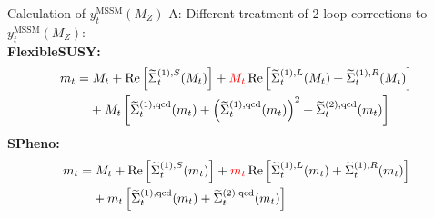 \documentclass[hyperref={pdfpagelabels=false},ngerman]{beamer}
\DeclareMathOperator{\re}{Re}
\renewcommand{\emph}{\textbf}
\begin{document}
\begin{frame}[noframenumbering]{Calculation of $y_t^{\text{MSSM}}(M_Z)$}
  A: Different treatment of 2-loop corrections to $y_t^{\text{MSSM}}(M_Z)$:
  \\[1em]
  \emph{FlexibleSUSY:}
  \begin{align*}
    m_t &=
    M_t+\re\left[
      \widetilde{\Sigma}_t^{(1),S}(M_t)\right] +
    \textcolor{red}{M_t} \re\left[
      \widetilde{\Sigma}_t^{(1),L}(M_t) +
      \widetilde{\Sigma}_t^{(1),R}(M_t)
    \right] \nonumber \\
    &\phantom{={}} + M_t
    \left[\widetilde{\Sigma}_t^{(1),\text{qcd}}(m_t)
      + \left(\widetilde{\Sigma}_t^{(1),\text{qcd}}(m_t)\right)^2
      + \widetilde{\Sigma}_t^{(2),\text{qcd}}(m_t)\right]
  \end{align*}
  \emph{SPheno:}
  \begin{align*}
    m_t &=
    M_t+\re\left[
      \widetilde{\Sigma}_t^{(1),S}(m_t)\right]+
    \textcolor{red}{m_t} \re\left[
      \widetilde{\Sigma}_t^{(1),L}(m_t) +
      \widetilde{\Sigma}_t^{(1),R}(m_t)
    \right] \nonumber \\
    &\phantom{={}} +
    m_t
    \left[\widetilde{\Sigma}_t^{(1),\text{qcd}}(m_t) +
      \widetilde{\Sigma}_t^{(2),\text{qcd}}(m_t)
    \right]
  \end{align*}
\end{frame}

\newcommand{\FS}{FlexibleSUSY\xspace}
\newcommand{\SARAH}{SARAH\xspace}
\newcommand{\Softsusy}{SOFTSUSY\xspace}
\newcommand{\SPheno}{SPheno\xspace}
\newcommand{\SUSYHD}{SUSYHD\xspace}

\newcommand{\bgsgs}{\beta_{\gshigh,\gshigh^2}}
\newcommand{\bytgs}{\beta_{\ythigh,\gshigh^2}}
\newcommand{\bytyt}{\beta_{\ythigh,\ythigh^2}}
\newcommand{\bvyt}{\beta_{\vhigh,\ythigh^2}}
\newcommand{\blambdaytyt}{\beta_{\lambdahigh,\ythigh^4}}
\newcommand{\blambdayt}{\beta_{\lambdahigh,\ythigh^2\lambdahigh}}
\newcommand{\blambdalambda}{\beta_{\lambdahigh,\lambdahigh^2}}
\newcommand{\btildegsgs}{\tilde\beta_{\gshigh,\gshigh^2}}
\newcommand{\btildeytgs}{\tilde\beta_{\ythigh,\gshigh^2}}
\newcommand{\btildeytyt}{\tilde\beta_{\ythigh,\ythigh^2}}
\newcommand{\btildevyt}{\tilde\beta_{\vhigh,\ythigh^2}}

\newcommand{\gs}{\hat{g}_3}
\newcommand{\gsMSSM}{\bar{g}_3}
\newcommand{\ytlow}{\hat{y}_t}
\newcommand{\ytMSSMlow}{\bar{y}_t}
\newcommand{\vlow}{\hat{v}}
\newcommand{\vMSSM}{\bar{v}}
\newcommand{\gshigh}{{g}_3}
\newcommand{\gsMSSMhigh}{\tilde{g}_3}
\newcommand{\ythigh}{y_t}
\newcommand{\ytMSSMhigh}{\tilde{y}_t}
\newcommand{\vhigh}{v}
\newcommand{\vMSSMhigh}{\tilde{v}}
\newcommand{\lambdalow}{\hat{\lambda}}
\newcommand{\lambdahigh}{{\lambda}}
\end{document}
